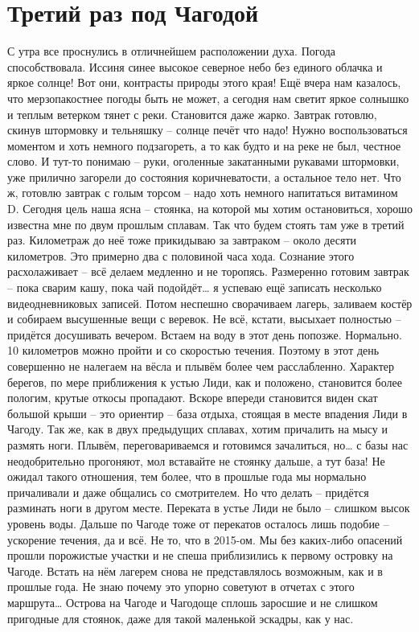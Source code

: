 \chapter{Третий раз под Чагодой} 

С утра все проснулись в отличнейшем расположении духа. Погода способствовала. Иссиня синее высокое северное небо без единого облачка и яркое солнце! Вот они, контрасты природы этого края! Ещё вчера нам казалось, что мерзопакостнее погоды быть не может, а сегодня нам светит яркое солнышко и теплым ветерком тянет с реки. Становится даже жарко. Завтрак готовлю, скинув штормовку и тельняшку – солнце печёт что надо! Нужно воспользоваться моментом и хоть немного подзагореть, а то как будто и на реке не был, честное слово. И тут-то понимаю – руки, оголенные закатанными рукавами штормовки, уже прилично загорели до состояния коричневатости, а остальное тело нет. Что ж, готовлю завтрак с голым торсом – надо хоть немного напитаться витамином D.
Сегодня цель наша ясна – стоянка, на которой мы хотим остановиться, хорошо известна мне по двум прошлым сплавам. Так что будем стоять там уже в третий раз. Километраж до неё тоже прикидываю за завтраком – около десяти километров. Это примерно два с половиной часа хода. Сознание этого расхолаживает – всё делаем медленно и не торопясь. Размеренно готовим завтрак – пока сварим кашу, пока чай подойдёт… я успеваю ещё записать несколько видеодневниковых записей. Потом неспешно сворачиваем лагерь, заливаем костёр и собираем высушенные вещи с веревок. Не всё, кстати, высыхает полностью – придётся досушивать вечером.
Встаем на воду в этот день попозже. Нормально. 10 километров можно пройти и со скоростью течения. Поэтому в этот день совершенно не налегаем на вёсла и плывём более чем расслабленно.  Характер берегов, по мере приближения к устью Лиди, как и положено, становится более пологим, крутые откосы пропадают. Вскоре впереди становится виден скат большой крыши – это ориентир – база отдыха, стоящая в месте впадения Лиди в Чагоду. Так же, как в двух предыдущих сплавах, хотим причалить на мысу и размять ноги. Плывём, переговариваемся и готовимся зачалиться, но… с базы нас неодобрительно прогоняют, мол вставайте не стоянку дальше, а тут база! Не ожидал такого отношения, тем более, что в прошлые года мы нормально причаливали и даже общались со смотрителем. Но что делать – придётся разминать ноги в другом месте. 
Переката в устье Лиди не было – слишком высок уровень воды. Дальше по Чагоде тоже от перекатов осталось лишь подобие – ускорение течения, да и всё. Не то, что в 2015-ом. Мы без каких-либо опасений прошли порожистые участки и не спеша приблизились к первому островку на Чагоде. Встать на нём лагерем снова не представлялось возможным, как и в прошлые года. Не знаю почему это упорно советуют в отчетах с этого маршрута… Острова на Чагоде и Чагодоще сплошь заросшие и не слишком пригодные для стоянок, даже для такой маленькой эскадры, как у нас.
